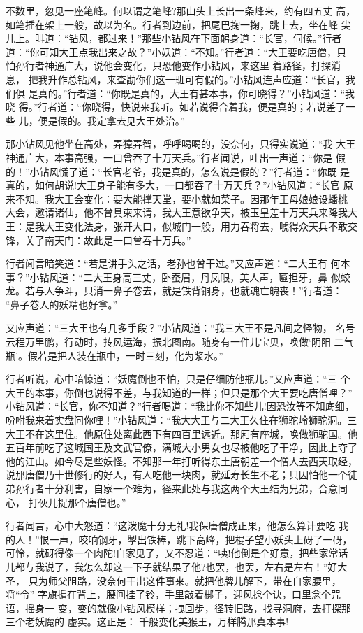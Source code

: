 不数里，忽见一座笔峰。何以谓之笔峰?那山头上长出一条峰来，约有四五丈
高，如笔插在架上一般，故以为名。行者到边前，把尾巴掬一掬，跳上去，坐在峰
尖儿上。叫道：“钻风，都过来！”那些小钻风在下面躬身道：“长官，伺候。”行者
道：“你可知大王点我出来之故？”小妖道：“不知。”行者道：“大王要吃唐僧，只
怕孙行者神通广大，说他会变化，只恐他变作小钻风，来这里着路径，打探消息，
把我升作总钻风，来查勘你们这一班可有假的。”小钻风连声应道：“长官，我们俱
是真的。”行者道：“你既是真的，大王有甚本事，你可晓得？”小钻风道：“我晓
得。”行者道：“你晓得，快说来我听。如若说得合着我，便是真的；若说差了一些
儿，便是假的。我定拿去见大王处治。”

那小钻风见他坐在高处，弄獐弄智，呼呼喝喝的，没奈何，只得实说道：“我
大王神通广大，本事高强，一口曾吞了十万天兵。”行者闻说，吐出一声道：“你是
假的！”小钻风慌了道：“长官老爷，我是真的，怎么说是假的？”行者道：“你既
是真的，如何胡说!大王身子能有多大，一口都吞了十万天兵？”小钻风道：“长官
原来不知。我大王会变化：要大能撑天堂，要小就如菜子。因那年王母娘娘设蟠桃
大会，邀请诸仙，他不曾具柬来请，我大王意欲争天，被玉皇差十万天兵来降我大
王：是我大王变化法身，张开大口，似城门一般，用力吞将去，唬得众天兵不敢交
锋，关了南天门：故此是一口曾吞十万兵。”

行者闻言暗笑道：“若是讲手头之话，老孙也曾干过。”又应声道：“二大王有
何本事？”小钻风道：“二大王身高三丈，卧蚕眉，丹凤眼，美人声，匾担牙，鼻
似蛟龙。若与人争斗，只消一鼻子卷去，就是铁背铜身，也就魂亡魄丧！”行者道：
“鼻子卷人的妖精也好拿。”

又应声道：“三大王也有几多手段？”小钻风道：“我三大王不是凡间之怪物，
名号云程万里鹏，行动时，抟风运海，振北图南。随身有一件儿宝贝，唤做‘阴阳
二气瓶’。假若是把人装在瓶中，一时三刻，化为浆水。”

行者听说，心中暗惊道：“妖魔倒也不怕，只是仔细防他瓶儿。”又应声道：“三
个大王的本事，你倒也说得不差，与我知道的一样；但只是那个大王要吃唐僧哩？”
小钻风道：“长官，你不知道？”行者喝道：“我比你不知些儿!因恐汝等不知底细，
吩咐我来着实盘问你哩！”小钻风道：“我大大王与二大王久住在狮驼岭狮驼洞。三
大王不在这里住。他原住处离此西下有四百里远近。那厢有座城，唤做狮驼国。他
五百年前吃了这城国王及文武官僚，满城大小男女也尽被他吃了干净，因此上夺了
他的江山。如今尽是些妖怪。不知那一年打听得东土唐朝差一个僧人去西天取经，
说那唐僧乃十世修行的好人，有人吃他一块肉，就延寿长生不老；只因怕他一个徒
弟孙行者十分利害，自家一个难为，径来此处与我这两个大王结为兄弟，合意同心，
打伙儿捉那个唐僧也。”

行者闻言，心中大怒道：“这泼魔十分无礼!我保唐僧成正果，他怎么算计要吃
我的人！”恨一声，咬响钢牙，掣出铁棒，跳下高峰，把棍子望小妖头上砑了一砑，
可怜，就砑得像一个肉陀!自家见了，又不忍道：“咦!他倒是个好意，把些家常话
儿都与我说了，我怎么却这一下子就结果了他?也罢，也罢，左右是左右！”好大圣，
只为师父阻路，没奈何干出这件事来。就把他牌儿解下，带在自家腰里，将“令”
字旗掮在背上，腰间挂了铃，手里敲着梆子，迎风捻个诀，口里念个咒语，摇身一
变，变的就像小钻风模样；拽回步，径转旧路，找寻洞府，去打探那三个老妖魔的
虚实。这正是：
千般变化美猴王，万样腾那真本事!


